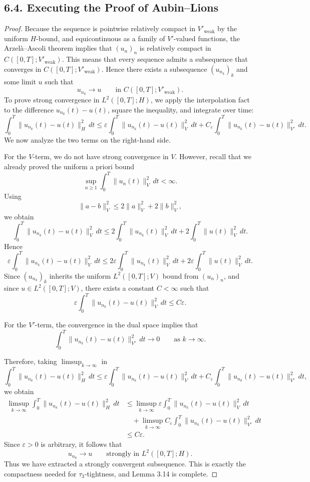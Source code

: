 \documentclass[11pt]{article}
\theoremstyle{definition}
\theoremstyle{remark}
\begin{document}
\subsection*{6.4. Executing the Proof of Aubin--Lions}
\begin{proof}
Because the sequence is pointwise relatively compact in $V'_{\mathrm{weak}}$ by the uniform $H$-bound, and equicontinuous as a family of $V'$-valued functions, the Arzel\`a--Ascoli theorem implies that $(u_n)_n$ is relatively compact in $C([0,T];V'_{\mathrm{weak}})$. This means that every sequence admits a subsequence that converges in $C([0,T];V'_{\mathrm{weak}})$. Hence there exists a subsequence $(u_{n_k})_k$ and some limit $u$ such that
\[
  u_{n_k}\to u
  \qquad \text{in } C([0,T];V'_{\mathrm{weak}}).
\]
To prove strong convergence in $L^2([0,T];H)$, we apply the interpolation fact to the difference $u_{n_k}(t)-u(t)$, square the inequality, and integrate over time:
\[
\int_0^T \|u_{n_k}(t)-u(t)\|_H^2\,dt
\le
\varepsilon \int_0^T \|u_{n_k}(t)-u(t)\|_V^2\,dt
+
C_\varepsilon \int_0^T \|u_{n_k}(t)-u(t)\|_{V'}^2\,dt.
\]
We now analyze the two terms on the right-hand side.

For the $V$-term, we do not have strong convergence in $V$. However, recall that we already proved the uniform a priori bound
\[
  \sup_{n\ge 1}\int_0^T \|u_n(t)\|_V^2\,dt<\infty.
\]
Using
\[
  \|a-b\|_V^2\le 2\|a\|_V^2+2\|b\|_V^2,
\]
we obtain
\[
  \int_0^T \|u_{n_k}(t)-u(t)\|_V^2\,dt
  \le
  2\int_0^T \|u_{n_k}(t)\|_V^2\,dt
  +
  2\int_0^T \|u(t)\|_V^2\,dt.
\]
Hence
\[
  \varepsilon\int_0^T \|u_{n_k}(t)-u(t)\|_V^2\,dt
  \le
  2\varepsilon\int_0^T \|u_{n_k}(t)\|_V^2\,dt
  +
  2\varepsilon\int_0^T \|u(t)\|_V^2\,dt.
\]
Since $(u_{n_k})_k$ inherits the uniform $L^2([0,T];V)$ bound from $(u_n)_n$, and since $u\in L^2([0,T];V)$, there exists a constant $C<\infty$ such that
\[
  \varepsilon\int_0^T \|u_{n_k}(t)-u(t)\|_V^2\,dt\le C\varepsilon.
\]

For the $V'$-term, the convergence in the dual space implies that
\[
  \int_0^T \|u_{n_k}(t)-u(t)\|_{V'}^2\,dt\to 0
  \qquad \text{as } k\to\infty.
\]

Therefore, taking $\limsup_{k\to\infty}$ in
\[
\int_0^T \|u_{n_k}(t)-u(t)\|_H^2\,dt
\le
\varepsilon \int_0^T \|u_{n_k}(t)-u(t)\|_V^2\,dt
+
C_\varepsilon \int_0^T \|u_{n_k}(t)-u(t)\|_{V'}^2\,dt,
\]
we obtain
\begin{align*}
  \limsup_{k\to\infty}
  \int_0^T \|u_{n_k}(t)-u(t)\|_H^2\,dt
  &\le
  \limsup_{k\to\infty}
  \varepsilon \int_0^T \|u_{n_k}(t)-u(t)\|_V^2\,dt \\
  &\quad+
  \limsup_{k\to\infty}
  C_\varepsilon \int_0^T \|u_{n_k}(t)-u(t)\|_{V'}^2\,dt \\
  &\le
  C\varepsilon.
\end{align*}
Since $\varepsilon>0$ is arbitrary, it follows that
\[
  u_{n_k}\to u
  \qquad \text{strongly in } L^2([0,T];H).
\]
Thus we have extracted a strongly convergent subsequence. This is exactly the compactness needed for $\tau_3$-tightness, and Lemma 3.14 is complete.
\end{proof}
\end{document}
